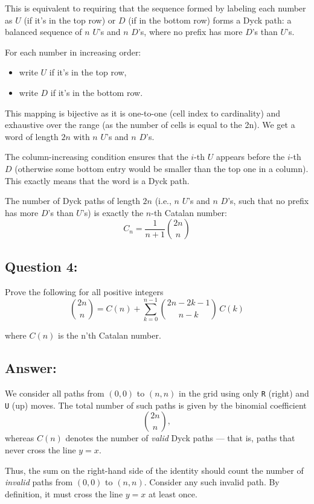 \documentclass{article}
\begin{document}
This is equivalent to requiring that the sequence formed by labeling each number as $U$ (if it's in the top row) or $D$ (if in the bottom row) forms a Dyck path: a balanced sequence of $n$ $U$'s and $n$ $D$'s, where no prefix has more $D$'s than $U$'s.

For each number in increasing order:
\begin{itemize}
    \item write $U$ if it's in the top row,
    \item write $D$ if it's in the bottom row.
\end{itemize}

This mapping is bijective as it is one-to-one (cell index to cardinality) and exhaustive over the range (as the number of cells is equal to the 2n). We get a word of length $2n$ with $n$ $U$'s and $n$ $D$'s.

The column-increasing condition ensures that the $i$-th $U$ appears before the $i$-th $D$ (otherwise some bottom entry would be smaller than the top one in a column). This exactly means that the word is a Dyck path.


The number of Dyck paths of length $2n$ (i.e., $n$ $U$'s and $n$ $D$'s, such that no prefix has more $D$'s than $U$'s) is exactly the $n$-th Catalan number:
\[
C_n = \frac{1}{n+1} \binom{2n}{n}
\]

\subsection*{Question 4:} Prove the following for all positive integers
\begin{equation*}
    \binom{2n}{n} = C(n) + \sum_{k=0}^{n-1} \binom{2n - 2k - 1}{n - k} \, C(k)
\end{equation*}

where $C(n)$ is the n'th Catalan number.

\subsection*{Answer:}
We consider all paths from $(0,0)$ to $(n,n)$ in the grid using only \texttt{R} (right) and \texttt{U} (up) moves. The total number of such paths is given by the binomial coefficient
\[
\binom{2n}{n},
\]
whereas $C(n)$ denotes the number of \emph{valid} Dyck paths — that is, paths that never cross the line $y = x$.

Thus, the sum on the right-hand side of the identity should count the number of \emph{invalid} paths from $(0,0)$ to $(n,n)$. Consider any such invalid path. By definition, it must cross the line $y = x$ at least once.
\end{document}
